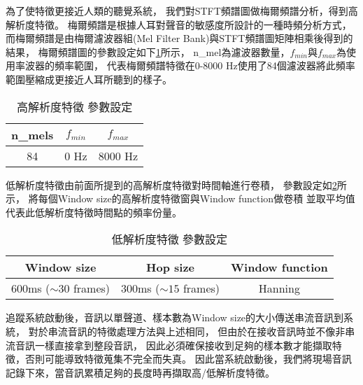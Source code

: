 \documentclass[class=NCU_thesis, crop=false]{standalone}
\begin{document}
為了使特徵更接近人類的聽覺系統，
我們對STFT頻譜圖做梅爾頻譜分析，得到高解析度特徵。
梅爾頻譜是根據人耳對聲音的敏感度所設計的一種時頻分析方式，
而梅爾頻譜是由梅爾濾波器組(Mel Filter Bank)與STFT頻譜圖矩陣相乘後得到的結果，
梅爾頻譜圖的參數設定如下\cref{table:table-high-resolution-feature-parameter-setting}所示，
n\_mel為濾波器數量，$f_{min}$與$f_{max}$為使用率波器的頻率範圍，
代表梅爾頻譜特徵在0-8000 Hz使用了84個濾波器將此頻率範圍壓縮成更接近人耳所聽到的樣子。

\begin{table}[h]
    \centering
    \caption{高解析度特徵 參數設定}
    \label{table:table-high-resolution-feature-parameter-setting}
    \begin{tabular}{|c|c|c|}
        \hline
        \multicolumn{1}{|c|}{n\_mels} & \multicolumn{1}{|c|}{$f_{min}$} & \multicolumn{1}{|c|}{$f_{max}$}\\
        \hline
        84 & 0 Hz & 8000 Hz\\
        \hline
    \end{tabular}
\end{table}

低解析度特徵由前面所提到的高解析度特徵對時間軸進行卷積，
參數設定如\cref{table:table-low-resolution-feature-parameter-setting}所示，
將每個Window size的高解析度特徵窗與Window function做卷積
並取平均值代表此低解析度特徵時間點的頻率份量。

\begin{table}[h]
    \centering
    \caption{低解析度特徵 參數設定}
    \label{table:table-low-resolution-feature-parameter-setting}
    \begin{tabular}{|c|c|c|}
        \hline
        \multicolumn{1}{|c|}{Window size} & \multicolumn{1}{|c|}{Hop size} & \multicolumn{1}{|c|}{Window function}\\
        \hline
        600ms ($\sim 30$ frames) & 300ms ($\sim 15$ frames) & Hanning \\
        \hline
    \end{tabular}
\end{table}

追蹤系統啟動後，音訊以單聲道、樣本數為Window size的大小傳送串流音訊到系統，
對於串流音訊的特徵處理方法與上述相同，
但由於在接收音訊時並不像非串流音訊一樣直接拿到整段音訊，
因此必須確保接收到足夠的樣本數才能擷取特徵，否則可能導致特徵蒐集不完全而失真。
因此當系統啟動後，我們將現場音訊記錄下來，當音訊累積足夠的長度時再擷取高/低解析度特徵。
\end{document}
